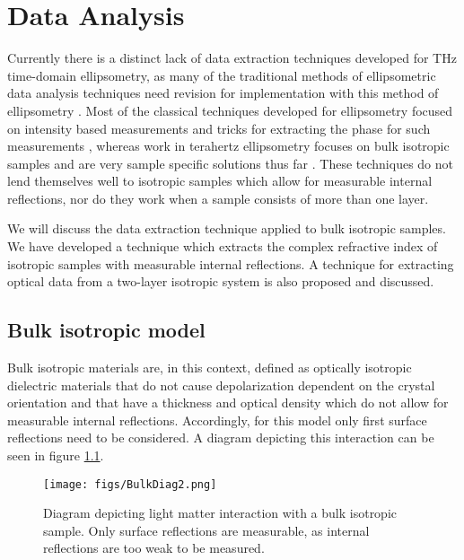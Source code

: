 \chapter{Data Analysis}
\label{chp:Analysis}

Currently there is a distinct lack of data extraction techniques developed for THz time-domain ellipsometry, as many of the traditional methods of ellipsometric data analysis techniques need revision for implementation with this method of ellipsometry \cite{Xuequan2018, Neshat2013, doi:10.1063/1.4940976, Chen2017}. Most of the classical techniques developed for ellipsometry focused on intensity based measurements and tricks for extracting the phase for such measurements \cite{Tompkins-2005}, whereas work in terahertz ellipsometry focuses on bulk isotropic samples and are very sample specific solutions thus far \cite{Xuequan2018, Neshat2013, doi:10.1063/1.4940976, Chen2017}. These techniques do not lend themselves well to isotropic samples which allow for measurable internal reflections, nor do they work when a sample consists of more than one layer. 

We will discuss the data extraction technique applied to bulk isotropic samples. We have developed a technique which extracts the complex refractive index of isotropic samples with measurable internal reflections. A technique for extracting optical data from a two-layer isotropic system is also proposed and discussed. 

\section{Bulk isotropic model}
\label{sec:BIM}
Bulk isotropic materials are, in this context, defined as optically isotropic dielectric materials that do not cause depolarization dependent on the crystal orientation and that have a thickness and optical density which do not allow for measurable internal reflections. Accordingly, for this model only first surface reflections need to be considered. A diagram depicting this interaction can be seen in figure \ref{fig:BulkDiag}.

\begin{figure}[H]
\begin{center}
	 \texttt{[image: figs/BulkDiag2.png]}
	 \caption[Diagram of light-matter interaction with bulk isotropic sample]{Diagram depicting light matter interaction with a bulk isotropic sample. Only surface reflections are measurable, as internal reflections are too weak to be measured.}
   \label{fig:BulkDiag}
\end{center}
\end{figure}

